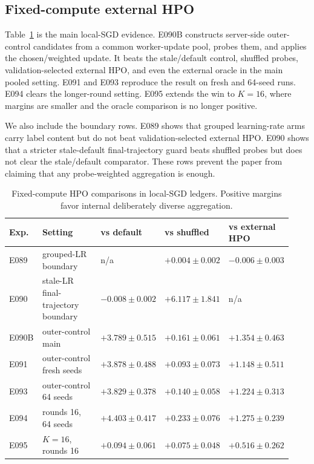 \subsection{Fixed-compute external HPO}

Table~\ref{tab:fixed-compute} is the main local-SGD evidence. E090B constructs
server-side outer-control candidates from a common worker-update pool, probes
them, and applies the chosen/weighted update. It beats the stale/default
control, shuffled probes, validation-selected external HPO, and even the
external oracle in the main pooled setting. E091 and E093 reproduce the result
on fresh and 64-seed runs. E094 clears the longer-round setting. E095 extends
the win to $K=16$, where margins are smaller and the oracle comparison is no
longer positive.

We also include the boundary rows. E089 shows that grouped learning-rate arms
carry label content but do not beat validation-selected external HPO. E090
shows that a stricter stale-default final-trajectory guard beats shuffled
probes but does not clear the stale/default comparator. These rows prevent the
paper from claiming that any probe-weighted aggregation is enough.

\begin{table}[t]
\centering
\small
\caption{Fixed-compute HPO comparisons in local-SGD ledgers. Positive margins
favor internal deliberately diverse aggregation.}
\label{tab:fixed-compute}
\begin{tabular}{@{}p{0.12\linewidth}p{0.30\linewidth}p{0.17\linewidth}p{0.17\linewidth}p{0.17\linewidth}@{}}
\toprule
Exp. & Setting & vs default & vs shuffled & vs external HPO \\
\midrule
E089 & grouped-LR boundary & n/a & $+0.004 \pm 0.002$ & $-0.006 \pm 0.003$ \\
E090 & stale-LR final-trajectory boundary & $-0.008 \pm 0.002$ & $+6.117 \pm 1.841$ & n/a \\
E090B & outer-control main & $+3.789 \pm 0.515$ & $+0.161 \pm 0.061$ & $+1.354 \pm 0.463$ \\
E091 & outer-control fresh seeds & $+3.878 \pm 0.488$ & $+0.093 \pm 0.073$ & $+1.148 \pm 0.511$ \\
E093 & outer-control 64 seeds & $+3.829 \pm 0.378$ & $+0.140 \pm 0.058$ & $+1.224 \pm 0.313$ \\
E094 & rounds 16, 64 seeds & $+4.403 \pm 0.417$ & $+0.233 \pm 0.076$ & $+1.275 \pm 0.239$ \\
E095 & $K=16$, rounds 16 & $+0.094 \pm 0.061$ & $+0.075 \pm 0.048$ & $+0.516 \pm 0.262$ \\
\bottomrule
\end{tabular}
\end{table}

